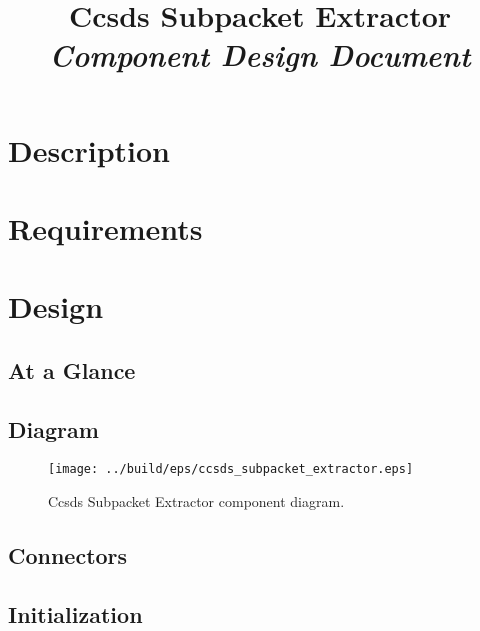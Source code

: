 



\title{\textbf{Ccsds Subpacket Extractor} \\
\large\textit{Component Design Document}}
\date{}
\maketitle

\section{Description}


\section{Requirements}


\section{Design}

\subsection{At a Glance}


\subsection{Diagram}
\begin{figure}[H]
  \texttt{[image: ../build/eps/ccsds\_subpacket\_extractor.eps]}
  \caption{Ccsds Subpacket Extractor component diagram.}
\end{figure}



\subsection{Connectors}


\subsection{Initialization}


